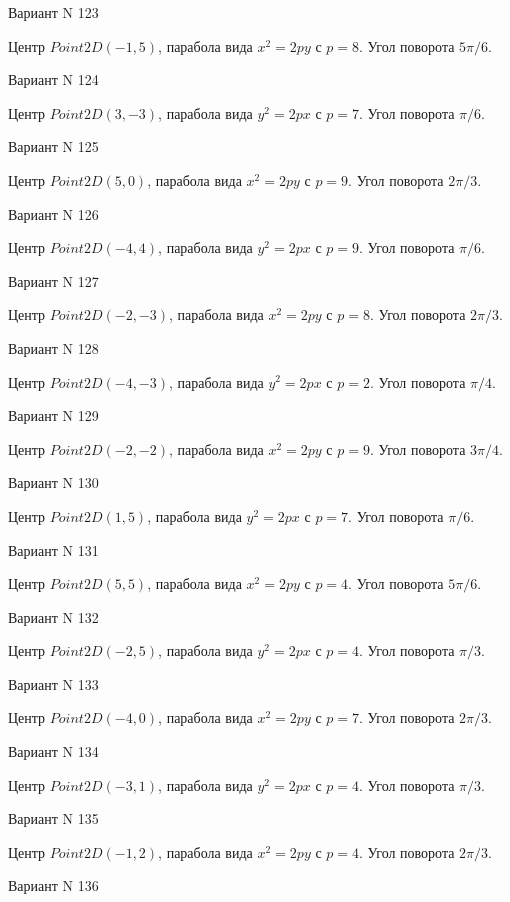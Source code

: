 \documentclass[11pt]{report}
\begin{document}
Вариант N 123

Центр $Point2D\left(-1, 5\right)$, парабола вида $x^{2} = 2py$ с $p = 8$. Угол поворота $5 \pi / 6$.

Вариант N 124

Центр $Point2D\left(3, -3\right)$, парабола вида $y^{2} = 2px$ с $p = 7$. Угол поворота $\pi / 6$.

Вариант N 125

Центр $Point2D\left(5, 0\right)$, парабола вида $x^{2} = 2py$ с $p = 9$. Угол поворота $2 \pi / 3$.

Вариант N 126

Центр $Point2D\left(-4, 4\right)$, парабола вида $y^{2} = 2px$ с $p = 9$. Угол поворота $\pi / 6$.

Вариант N 127

Центр $Point2D\left(-2, -3\right)$, парабола вида $x^{2} = 2py$ с $p = 8$. Угол поворота $2 \pi / 3$.

Вариант N 128

Центр $Point2D\left(-4, -3\right)$, парабола вида $y^{2} = 2px$ с $p = 2$. Угол поворота $\pi / 4$.

Вариант N 129

Центр $Point2D\left(-2, -2\right)$, парабола вида $x^{2} = 2py$ с $p = 9$. Угол поворота $3 \pi / 4$.

Вариант N 130

Центр $Point2D\left(1, 5\right)$, парабола вида $y^{2} = 2px$ с $p = 7$. Угол поворота $\pi / 6$.

Вариант N 131

Центр $Point2D\left(5, 5\right)$, парабола вида $x^{2} = 2py$ с $p = 4$. Угол поворота $5 \pi / 6$.

Вариант N 132

Центр $Point2D\left(-2, 5\right)$, парабола вида $y^{2} = 2px$ с $p = 4$. Угол поворота $\pi / 3$.

Вариант N 133

Центр $Point2D\left(-4, 0\right)$, парабола вида $x^{2} = 2py$ с $p = 7$. Угол поворота $2 \pi / 3$.

Вариант N 134

Центр $Point2D\left(-3, 1\right)$, парабола вида $y^{2} = 2px$ с $p = 4$. Угол поворота $\pi / 3$.

Вариант N 135

Центр $Point2D\left(-1, 2\right)$, парабола вида $x^{2} = 2py$ с $p = 4$. Угол поворота $2 \pi / 3$.

Вариант N 136
\end{document}
